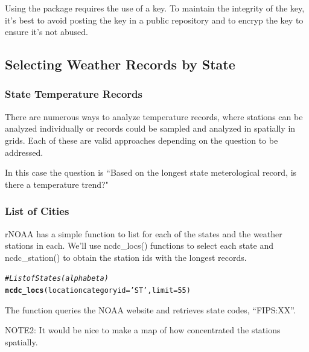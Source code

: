 \documentclass{article}\usepackage[]{graphicx}\usepackage[]{color}
\makeatletter
\newcommand{\hlnum}[1]{\textcolor[rgb]{0.686,0.059,0.569}{#1}}%
\newcommand{\hlstr}[1]{\textcolor[rgb]{0.192,0.494,0.8}{#1}}%
\newcommand{\hlcom}[1]{\textcolor[rgb]{0.678,0.584,0.686}{\textit{#1}}}%
\newcommand{\hlstd}[1]{\textcolor[rgb]{0.345,0.345,0.345}{#1}}%
\newcommand{\hlkwc}[1]{\textcolor[rgb]{0.333,0.667,0.333}{#1}}%
\newcommand{\hlkwd}[1]{\textcolor[rgb]{0.737,0.353,0.396}{\textbf{#1}}}%
\newenvironment{kframe}{%
 \def\at@end@of@kframe{}%
 \ifinner\ifhmode%
  \def\at@end@of@kframe{\end{minipage}}%
  \begin{minipage}{\columnwidth}%
 \fi\fi%
 \def\FrameCommand##1{\hskip\@totalleftmargin \hskip-\fboxsep
 \colorbox{shadecolor}{##1}\hskip-\fboxsep
     \hskip-\linewidth \hskip-\@totalleftmargin \hskip\columnwidth}%
 \MakeFramed {\advance\hsize-\width
   \@totalleftmargin\z@ \linewidth\hsize
   \@setminipage}}%
 {\par\unskip\endMakeFramed%
 \at@end@of@kframe}
\newenvironment{knitrout}{}{} %
\makeatother
\begin{document}
Using the package requires the use of a key. To maintain the integrity of the key, it's best to avoid posting the key in a public repository and to encryp the key to ensure it's not abused. 

\subsection{Selecting Weather Records by State}

\subsubsection{State Temperature Records}

There are numerous ways to analyze temperature records, where stations can be analyzed individually or records could be sampled and analyzed in spatially in grids. Each of these are valid approaches depending on the question to be addressed. 

In this case the question is ``Based on the longest state meterological record, is there a temperature trend?"

\subsubsection{List of Cities}

rNOAA has a simple function to list for each of the states and the weather stations in each. We'll use ncdc\_locs() functions to select each state and ncdc\_station() to obtain the station ids with the longest records. 

\begin{knitrout}
\color{fgcolor}\begin{kframe}
\begin{alltt}
\hlcom{# List of States (alpha beta)}
\hlkwd{ncdc_locs}\hlstd{(}\hlkwc{locationcategoryid}\hlstd{=}\hlstr{'ST'}\hlstd{,} \hlkwc{limit}\hlstd{=}\hlnum{55}\hlstd{)}
\end{alltt}
\end{kframe}
\end{knitrout}

The function queries the NOAA website and retrieves state codes, ``FIPS:XX''.  


NOTE2: It would be nice to make a map of how concentrated the stations spatially. 
\end{document}
